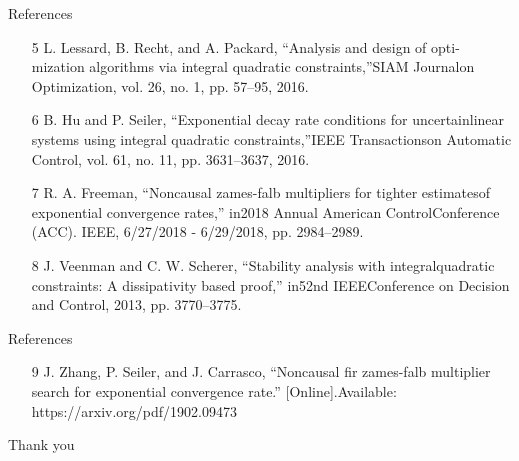 \documentclass{beamer}
\begin{document}
\begin{frame}{References}
	\begin{itemize}		
		\item[5]  L.  Lessard,  B.  Recht,  and  A.  Packard,  “Analysis  and  design  of  opti-mization  algorithms  via  integral  quadratic  constraints,”SIAM  Journalon Optimization, vol. 26, no. 1, pp. 57–95, 2016.
		\item[6]  B.  Hu  and  P.  Seiler,  “Exponential  decay  rate  conditions  for  uncertainlinear systems using integral quadratic constraints,”IEEE Transactionson Automatic Control, vol. 61, no. 11, pp. 3631–3637, 2016.
		\item[7]  R. A. Freeman, “Noncausal zames-falb multipliers for tighter estimatesof  exponential  convergence  rates,”  in2018  Annual  American  ControlConference (ACC).    IEEE, 6/27/2018 - 6/29/2018, pp. 2984–2989.
		\item[8]  J.   Veenman   and   C.   W.   Scherer,   “Stability   analysis   with   integralquadratic  constraints:  A  dissipativity  based  proof,”  in52nd  IEEEConference on Decision and Control, 2013, pp. 3770–3775.
	\end{itemize}
\end{frame}
\begin{frame}{References}
	\begin{itemize}		
		\item[9]  J.    Zhang,    P.    Seiler,    and    J.    Carrasco,    “Noncausal    fir    zames-falb  multiplier  search  for  exponential  convergence  rate.”  [Online].Available: https://arxiv.org/pdf/1902.09473
	\end{itemize}
\end{frame}
\begin{frame}{}
\begin{center}
    \huge{Thank you}
\end{center}
\end{frame}
\end{document}
